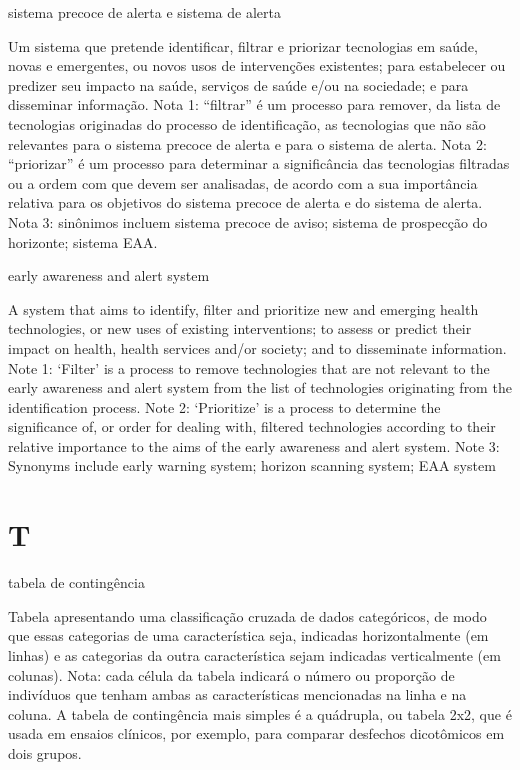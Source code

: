 \documentclass[
]{book}
\begin{document}
sistema precoce de alerta e sistema de alerta

Um sistema que pretende identificar, filtrar e priorizar tecnologias em saúde, novas e emergentes, ou novos usos de intervenções existentes; para estabelecer ou predizer seu impacto na saúde, serviços de saúde e/ou na sociedade; e para disseminar informação. Nota 1: ``filtrar'' é um processo para remover, da lista de tecnologias originadas do processo de identificação, as tecnologias que não são relevantes para o sistema precoce de alerta e para o sistema de alerta. Nota 2: ``priorizar'' é um processo para determinar a significância das tecnologias filtradas ou a ordem com que devem ser analisadas, de acordo com a sua importância relativa para os objetivos do sistema precoce de alerta e do sistema de alerta. Nota 3: sinônimos incluem sistema precoce de aviso; sistema de prospecção do horizonte; sistema EAA.

early awareness and alert system

A system that aims to identify, filter and prioritize new and emerging health technologies, or new uses of existing interventions; to assess or predict their impact on health, health services and/or society; and to disseminate information. Note 1: `Filter' is a process to remove technologies that are not relevant to the early awareness and alert system from the list of technologies originating from the identification process. Note 2: `Prioritize' is a process to determine the significance of, or order for dealing with, filtered technologies according to their relative importance to the aims of the early awareness and alert system. Note 3: Synonyms include early warning system; horizon scanning system; EAA system

\hypertarget{t}{%
\chapter*{T}\label{t}}

tabela de contingência

Tabela apresentando uma classificação cruzada de dados categóricos, de modo que essas categorias de uma característica seja, indicadas horizontalmente (em linhas) e as categorias da outra característica sejam indicadas verticalmente (em colunas). Nota: cada célula da tabela indicará o número ou proporção de indivíduos que tenham ambas as características mencionadas na linha e na coluna. A tabela de contingência mais simples é a quádrupla, ou tabela 2x2, que é usada em ensaios clínicos, por exemplo, para comparar desfechos dicotômicos em dois grupos.
\end{document}

